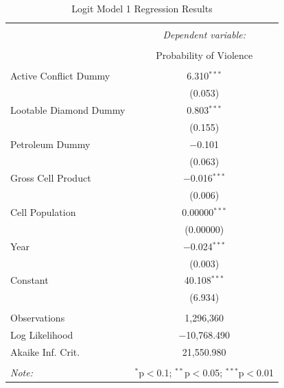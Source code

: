\begin{table}[h] \centering 
	\caption{Logit Model 1 Regression Results} 
	\label{} 
	\begin{tabular}{@{\extracolsep{5pt}}lc} 
		\\[-1.8ex]\hline 
		\hline \\[-1.8ex] 
		& \multicolumn{1}{c}{\textit{Dependent variable:}} \\ 
		\cline{2-2} 
		\\[-1.8ex] & Probability of Violence \\ 
		\hline \\[-1.8ex] 
		Active Conflict Dummy & 6.310$^{***}$ \\ 
		& (0.053) \\ 
		Lootable Diamond Dummy & 0.803$^{***}$ \\ 
		& (0.155) \\ 
		Petroleum Dummy & $-$0.101 \\ 
		& (0.063) \\ 
		Gross Cell Product & $-$0.016$^{***}$ \\ 
		& (0.006) \\ 
		Cell Population & 0.00000$^{***}$ \\ 
		& (0.00000) \\ 
		Year & $-$0.024$^{***}$ \\ 
		& (0.003) \\ 
		Constant & 40.108$^{***}$ \\ 
		& (6.934) \\ 
		\hline \\[-1.8ex] 
		Observations & 1,296,360 \\ 
		Log Likelihood & $-$10,768.490 \\ 
		Akaike Inf. Crit. & 21,550.980 \\ 
		\hline 
		\hline \\[-1.8ex] 
		\textit{Note:}  & \multicolumn{1}{r}{$^{*}$p$<$0.1; $^{**}$p$<$0.05; $^{***}$p$<$0.01} \\ 
	\end{tabular} 
\end{table}

